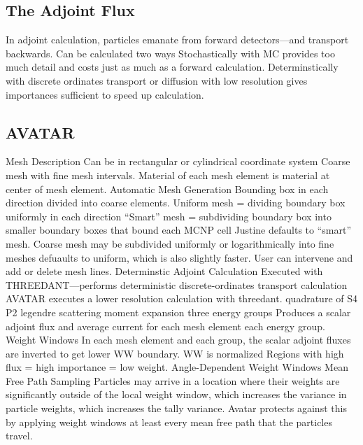 \documentclass{report}
\begin{document}
\subsection{The Adjoint Flux}
\begin{outline}
  \1 In adjoint calculation, particles emanate from forward detectors—and transport backwards. 
  \1 Can be calculated two ways
    \2 Stochastically with MC
      \3 provides too much detail and costs just as much as a forward calculation. 
    \2 Determinstically with discrete ordinates transport or diffusion
      \3 with low resolution gives importances sufficient to speed up calculation.
\end{outline}
\subsection{AVATAR}
\begin{outline}
  \1 Mesh Description
    \2 Can be in rectangular or cylindrical coordinate system
    \2 Coarse mesh with fine mesh intervals. 
      \3 Material of each mesh element is material at center of mesh element. 
  \1 Automatic Mesh Generation
    \2 Bounding box in each direction divided into coarse elements. 
      \3 Uniform mesh = dividing boundary box uniformly in each direction
      \3 “Smart” mesh = subdividing boundary box into smaller boundary boxes that bound each MCNP cell
        \4 Justine defaults to “smart” mesh. 
    \2 Coarse mesh may be subdivided uniformly or logarithmically into fine meshes
      \3 defuaults to uniform, which is also slightly faster. 
    \2 User can intervene and add or delete mesh lines. 
  \1 Determinstic Adjoint Calculation 
    \2 Executed with THREEDANT—performs deterministic discrete-ordinates transport calculation 
      \3 AVATAR executes a lower resolution calculation with threedant. 
        \4 quadrature of S4
        \4 P2 legendre scattering moment expansion
        \4 three energy groups
    \2 Produces a scalar adjoint flux and average current for 
      \3 each mesh element
      \3 each energy group. 
  \1 Weight Windows
    \2 In each mesh element and each group, the scalar adjoint fluxes are inverted to get lower WW boundary. 
      \3 WW is normalized
      \3 Regions with high flux = high importance = low weight. 
  \1 Angle-Dependent Weight Windows
  \1 Mean Free Path Sampling
    \2 Particles may arrive in a location where their weights are significantly outside of the local weight window, which increases the variance in particle weights, which increases the tally variance. 
    \2 Avatar protects against this by applying weight windows at least every mean free path that the particles travel. 
\end{outline}
\end{document}
